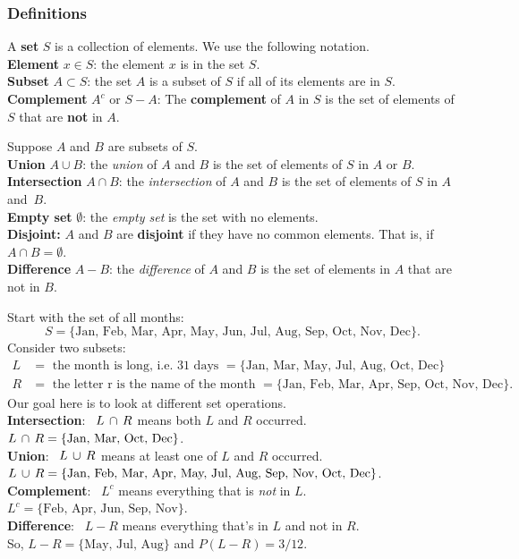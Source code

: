 \subsubsection{Definitions}
A \textbf{set} $S$ is a collection of elements. We use the following notation.\\
\textbf{Element} $x \in S$: the element $x$ is in the set $S$.\\
{\bf Subset} $A \subset S$: the set $A$ is a subset of $S$ if all of its elements are in $S$. \\
{\bf Complement} $A^c$ or $S - A$: The {\bf complement} of $A$ in $S$ is the set of elements of $S$ that are {\bf not} in $A$. 

\medskip

Suppose $A$ and $B$ are subsets of $S$. \\
\textbf{Union} $A \cup B$: the {\em union} of $A$ and $B$ is the set of elements of $S$ in $A$ or $B$. \\
\textbf{Intersection} $A \cap B$: the {\em intersection} of $A$ and $B$ is the set of elements of $S$ in $A$ and~$B$. \\
\textbf{Empty set} $\emptyset$: the {\em empty set} is the set with no elements. \\
\textbf{Disjoint: } $A$ and $B$ are {\bf disjoint} if they have no common elements. That is, if $A \cap B = \emptyset$.\\
\textbf{Difference} $A - B$: the {\em difference} of $A$ and $B$ is the set of elements in $A$ that are not in $B$.

\medskip

\numexamp 
Start with the set of all months:
\[S = \{\text{Jan, Feb, Mar, Apr, May, Jun, Jul, Aug, Sep, Oct, 
Nov, Dec}\}.
\]
Consider two subsets:
\[
\begin{array}{lllll}
L &= \text{ the month is long, i.e. 31 days } = 
\{\text{Jan, Mar, May, Jul, Aug, Oct, Dec}\}\\
R &= \text{ the letter r is the name of the month  } = 
\{\text{Jan, Feb, Mar, Apr, Sep, Oct, Nov, Dec}\}.
\end{array}
\]
Our goal here is to look at different set operations.\\
\textbf{Intersection}: \, $L\,\cap\, R$ means both $L$ and $R$ occurred.
$L\,\cap\, R = \{\text{Jan, Mar, Oct, Dec}\}$.\\
\textbf{Union}: \, $L \,\cup\,  R$ means at least 
one of $L$ and $R$ occurred.\\
$L\,\cup\, R = \{\text{Jan, Feb, Mar, Apr, May, Jul, Aug, Sep, Nov, Oct, Dec}\}$.\\
\textbf{Complement}: \, $L^c$ means everything that is \emph{not} in $L$.
$L^c = \{\text{Feb, Apr, Jun, Sep, Nov}\}$.\\
\textbf{Difference}: \, $L-R$ means everything that's in $L$ and not
in $R$. \\
So,
$L-R = \{\text{May, Jul, Aug}\}$ and $P(L-R) = 3/12$.

